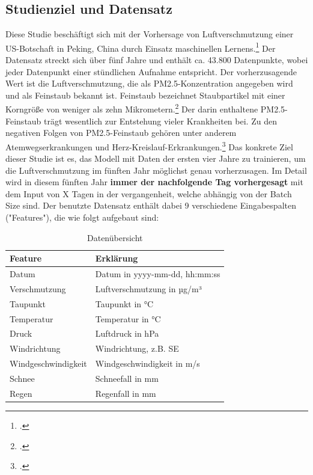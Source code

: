 \documentclass{article}
\begin{document}
\subsection{Studienziel und Datensatz}
Diese Studie beschäftigt sich mit der Vorhersage von Luftverschmutzung einer US-Botschaft in Peking, China durch Einsatz maschinellen Lernens.\footcite[vgl.][1]{AirPollutionForecasting}
Der Datensatz streckt sich über fünf Jahre und enthält ca. 43.800 Datenpunkte, wobei jeder Datenpunkt einer stündlichen Aufnahme entspricht. 
Der vorherzusagende Wert ist die Luftverschmutzung, die als PM2.5-Konzentration angegeben wird und als Feinstaub bekannt ist.
Feinstaub bezeichnet Staubpartikel mit einer Korngröße von weniger als zehn Mikrometern.\footcite[vgl.][1]{bundesumweltministeriumsFeinstaub}
Der darin enthaltene PM2.5-Feinstaub trägt wesentlich zur Entstehung vieler Krankheiten bei.
Zu den negativen Folgen von PM2.5-Feinstaub gehören unter anderem Atemwegserkrankungen und Herz-Kreislauf-Erkrankungen.\footcite[vgl.][1]{FeinstaubPM2}
Das konkrete Ziel dieser Studie ist es, das Modell mit Daten der ersten vier Jahre zu trainieren, um die Luftverschmutzung im fünften Jahr möglichst genau vorherzusagen.
Im Detail wird in diesem fünften Jahr \textbf{immer der nachfolgende Tag vorhergesagt} mit dem Input von X Tagen in der vergangenheit, welche abhängig von der Batch Size sind.
Der benutzte Datensatz enthält dabei 9 verschiedene Eingabespalten ("Features"), die wie folgt aufgebaut sind:
\begin{table}[h!]
  \centering
  \begin{tabular}{|l|l|}
  \hline
  \textbf{Feature} & \textbf{Erklärung} \\ \hline
  Datum            & Datum in yyyy-mm-dd, hh:mm:ss \\ \hline
  Verschmutzung    & Luftverschmutzung in µg/m³ \\ \hline
  Taupunkt         & Taupunkt in °C \\ \hline
  Temperatur       & Temperatur in °C \\ \hline
  Druck            & Luftdruck in hPa \\ \hline
  Windrichtung     & Windrichtung, z.B. SE \\ \hline
  Windgeschwindigkeit & Windgeschwindigkeit in m/s \\ \hline
  Schnee           & Schneefall in mm \\ \hline
  Regen            & Regenfall in mm \\ \hline
  \end{tabular}
  \caption{Datenübersicht}
  \label{tab:datenuebersicht}
  \end{table} 
\end{document}

